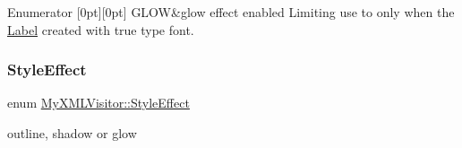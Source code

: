 \begin{DoxyEnumFields}{Enumerator}
[0pt][0pt]{}\mbox{\label{classMyXMLVisitor_a7f84d816c0b481e9cb35884996af6c2cac1f6db55d4aa7ba3eda97848763b6489}} 
G\+L\+OW&glow effect enabled  Limiting use to only when the \hyperlink{classLabel}{Label} created with true type font. \\
\hline

\end{DoxyEnumFields}
\mbox{\label{classMyXMLVisitor_a7f84d816c0b481e9cb35884996af6c2c}} 
\subsubsection{\texorpdfstring{Style\+Effect}{StyleEffect}\hspace{0.1cm}{\footnotesize\ttfamily [2/2]}}
{\footnotesize\ttfamily enum \hyperlink{classMyXMLVisitor_a7f84d816c0b481e9cb35884996af6c2c}{My\+X\+M\+L\+Visitor\+::\+Style\+Effect}\hspace{0.3cm}{\ttfamily [strong]}}



outline, shadow or glow 

